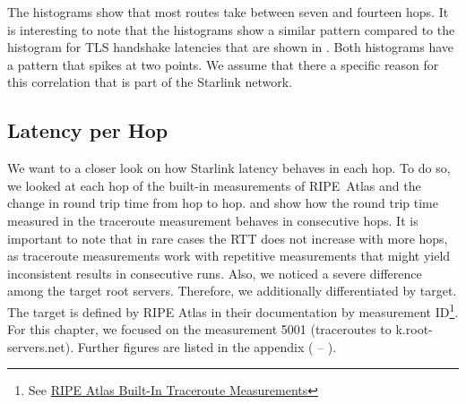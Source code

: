 The histograms show that most routes take between seven and fourteen hops.
It is interesting to note that the histograms show a similar pattern compared
to the histogram for TLS handshake latencies that are shown in
. Both histograms have a pattern that spikes at
two points. We assume that there a specific reason for this correlation that is
part of the Starlink network.

\subsection{Latency per Hop}

We want to a closer look on how Starlink latency behaves in each hop. To do so,
we looked at each hop of the built-in measurements of RIPE~Atlas and the change
in round trip time from hop to hop.  and
 show how the round trip time measured in
the traceroute measurement behaves in consecutive hops. It is important to note
that in rare cases the RTT does not increase with more hops, as traceroute
measurements work with repetitive measurements that might yield inconsistent
results in consecutive runs. Also, we noticed a severe difference among the
target root servers. Therefore, we additionally differentiated by target. The
target is defined by RIPE Atlas in their documentation by measurement
ID\footnote{See
	\href{https://atlas.ripe.net/docs/built-in-measurements/\#traceroute-5-000-6-999}{RIPE
		Atlas Built-In Traceroute Measurements}}. For this chapter, we focused on the
measurement 5001 (traceroutes to k.root-servers.net). Further figures are
listed in the appendix ( --
).

